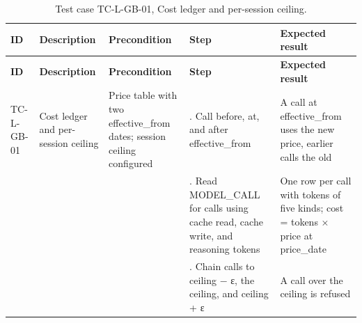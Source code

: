 {\small
\begin{longtable}{|>{\raggedright\arraybackslash}p{}|>{\raggedright\arraybackslash}p{}|>{\raggedright\arraybackslash}p{}|>{\raggedright\arraybackslash}p{}|>{\raggedright\arraybackslash}p{}|}
\caption{Test case TC-L-GB-01, Cost ledger and per-session ceiling.} \\
\hline
\textbf{ID} & \textbf{Description} & \textbf{Precondition} & \textbf{Step} & \textbf{Expected result} \\ \hline
\endfirsthead
\hline
\textbf{ID} & \textbf{Description} & \textbf{Precondition} & \textbf{Step} & \textbf{Expected result} \\ \hline
\endhead
TC-L-GB-01 & Cost ledger and per-session ceiling & Price table with two effective\_from dates; session ceiling configured & 1. Call before, at, and after effective\_from & A call at effective\_from uses the new price, earlier calls the old \\ \hline
 &  &  & 2. Read MODEL\_CALL for calls using cache read, cache write, and reasoning tokens & One row per call with tokens of five kinds; cost = tokens × price at price\_date \\ \hline
 &  &  & 3. Chain calls to ceiling $-$ ε, the ceiling, and ceiling + ε & A call over the ceiling is refused \\ \hline
\end{longtable}
}


